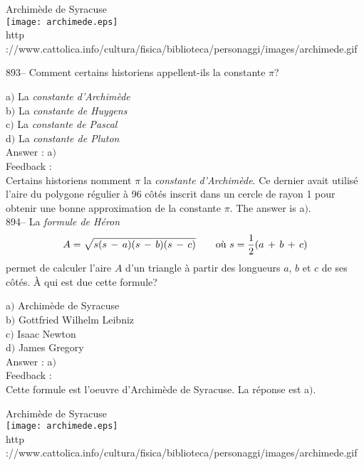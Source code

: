\documentclass[letterpaper, 12pt]{article}
\begin{document}
        \begin{center}
        Archim\`ede de Syracuse\\
    \texttt{[image: archimede.eps]}\\
        {\footnotesize http
://www.cattolica.info/cultura/fisica/biblioteca/personaggi/images/archimede.gif}
    \end{center}

893-- Comment certains historiens appellent-ils la constante $\pi$?

a$)$ La {\sl constante d'Archim\`ede} \\
b$)$ La {\sl constante de Huygens} \\
c$)$ La {\sl constante de Pascal} \\
d$)$ La {\sl constante de Pluton} \\

Answer : a$)$\\

Feedback : \\
Certains historiens nomment $\pi$ la {\sl constante d'Archim\`ede}.
Ce dernier avait utilis\'e l'aire du polygone r\'egulier
\`a 96 c\^ot\'es inscrit dans un cercle de rayon 1 pour obtenir une bonne
approximation de la constante $\pi$. The answer is a$)$.\\

894-- La {\sl formule de H\'eron}
$$A=\sqrt{s(s\,-\,a)(s\,-\,b)(s\,-\,c)}\hskip 20 pt \text{o\`u }
s=\displaystyle\frac12(a\,+\,b\,+\,c)$$
permet de calculer l'aire $A$ d'un triangle \`a partir des longueurs
$a$, $b$ et $c$ de ses c\^ot\'es. \`A qui est due cette formule?

a$)$ Archim\`ede de Syracuse \\
b$)$ Gottfried Wilhelm Leibniz \\
c$)$ Isaac Newton \\
d$)$ James Gregory \\

Answer : a$)$\\

Feedback : \\
Cette formule est l'oeuvre d'Archim\`ede de Syracuse. La r\'eponse
est a$)$.

        \begin{center}
        Archim\`ede de Syracuse\\
    \texttt{[image: archimede.eps]}\\
        {\footnotesize http
://www.cattolica.info/cultura/fisica/biblioteca/personaggi/images/archimede.gif}
    \end{center}
\end{document}

